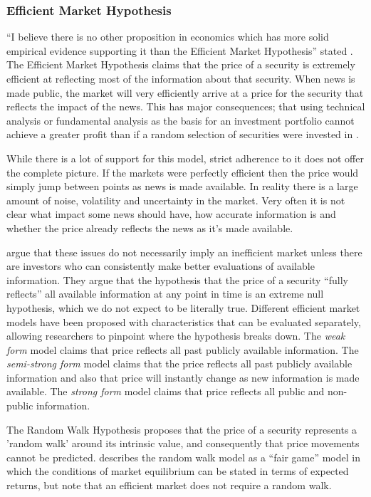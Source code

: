 \documentclass[12pt, oneside, a4paper]{article}
\theoremstyle{definition}
\begin{document}
\subsubsection{Efficient Market Hypothesis}
\label{emh}
``I believe there is no other proposition in economics which has more solid empirical evidence supporting it than the Efficient Market Hypothesis'' stated \cite{jensen1978some}. The Efficient Market Hypothesis claims that the price of a security is extremely efficient at reflecting most of the information about that security. When news is made public, the market will very efficiently arrive at a price for the security that reflects the impact of the news. This has major consequences; that using technical analysis or fundamental analysis as the basis for an investment portfolio cannot achieve a greater profit than if a random selection of securities were invested in \citep{emhAndCritics}.

While there is a lot of support for this model, strict adherence to it does not offer the complete picture. If the markets were perfectly efficient then the price would simply jump between points as news is made available. In reality there is a large amount of noise, volatility and uncertainty in the market. Very often it is not clear what impact some news should have, how accurate information is and whether the price already reflects the news as it's made available.

\cite{malkiel1970efficient} argue that these issues do not necessarily imply an inefficient market unless there are investors who can consistently make better evaluations of available information. They argue that the hypothesis that the price of a security ``fully reflects'' all available information at any point in time is an extreme null hypothesis, which we do not expect to be literally true. Different efficient market models have been proposed with characteristics that can be evaluated separately, allowing researchers to pinpoint where the hypothesis breaks down. The \textit{weak form} model claims that price reflects all past publicly available information. The \textit{semi-strong form} model claims that the price reflects all past publicly available information and also that price will instantly change as new information is made available. The \textit{strong form} model claims that price reflects all public and non-public information.

The Random Walk Hypothesis proposes that the price of a security represents a 'random walk' around its intrinsic value, and consequently that price movements cannot be predicted. \cite{malkiel1970efficient} describes the random walk model as a ``fair game'' model in which the conditions of market equilibrium can be stated in terms of expected returns, but note that an efficient market does not require a random walk. 
\end{document}
